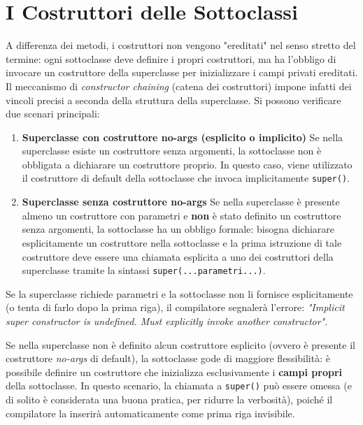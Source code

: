 \section{I Costruttori delle Sottoclassi}

A differenza dei metodi, i costruttori non vengono "ereditati" nel senso stretto del termine: ogni sottoclasse deve definire i propri costruttori, ma ha l'obbligo di invocare un costruttore della superclasse per inizializzare i campi privati ereditati. Il meccanismo di \textit{constructor chaining} (catena dei costruttori) impone infatti dei vincoli precisi a seconda della struttura della superclasse. Si possono verificare due scenari principali:

\begin{enumerate}
    \item \textbf{Superclasse con costruttore no-args (esplicito o implicito)}
    Se nella superclasse esiste un costruttore senza argomenti, la sottoclasse non è obbligata a dichiarare un costruttore proprio. In questo caso, viene utilizzato il costruttore di default della sottoclasse che invoca implicitamente \texttt{super()}.

    \item \textbf{Superclasse senza costruttore no-args}
    Se nella superclasse è presente almeno un costruttore con parametri e \textbf{non} è stato definito un costruttore senza argomenti, la sottoclasse ha un obbligo formale:
    bisogna dichiarare esplicitamente un costruttore nella sottoclasse e la prima istruzione di tale costruttore deve essere una chiamata esplicita a uno dei costruttori della superclasse tramite la sintassi \texttt{super(...parametri...)}.
\end{enumerate}

\begin{warningbox}
    Se la superclasse richiede parametri e la sottoclasse non li fornisce esplicitamente (o tenta di farlo dopo la prima riga), il compilatore segnalerà l'errore: \textit{"Implicit super constructor is undefined. Must explicitly invoke another constructor"}.
\end{warningbox}

\begin{warningbox}
    Se nella superclasse non è definito alcun costruttore esplicito (ovvero è presente il costruttore \textit{no-args} di default), la sottoclasse gode di maggiore flessibilità: è possibile definire un costruttore che inizializza esclusivamente i \textbf{campi propri} della sottoclasse. In questo scenario, la chiamata a \texttt{super()} può essere omessa (e di solito è considerata una buona pratica, per ridurre la verbosità), poiché il compilatore la inserirà automaticamente come prima riga invisibile.
\end{warningbox}


